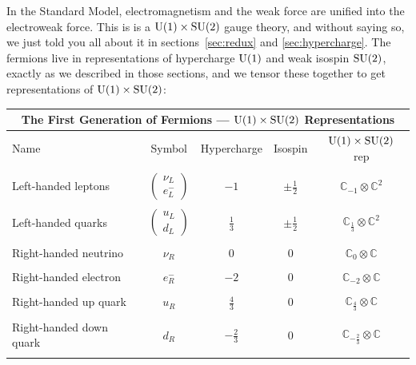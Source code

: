 \documentclass[12pt]{article}
\newcommand{\C}{{\mathbb C}}  %
\newcommand{\U}{{\rm U}}    %
\newcommand{\SU}{{\rm SU}}    %
\newcommand{\half}{\frac{1}{2}} %
\newcommand{\third}{\frac{1}{3}} %
\newcommand{\twothirds}{\frac{2}{3}} %
\newcommand{\fourthirds}{\frac{4}{3}} %
\newcommand{\lep}{\left( \! \begin{array}{c} \nu_L \\ e^-_L \end{array} \! \right)} %
\newcommand{\quark}{\left( \! \begin{array}{c} u_L \\ d_L \end{array} \! \right)} %
\begin{document}
In the Standard Model, electromagnetism and the weak force are unified into the
electroweak force. This is is a $\U(1) \times \SU(2)$ gauge theory, and without
saying so, we just told you all about it in sections~\ref{sec:redux} and
\ref{sec:hypercharge}. The fermions live in representations of hypercharge
$\U(1)$ and weak isospin $\SU(2)$, exactly as we described in those sections,
and we tensor these together to get representations of $\U(1) \times \SU(2)$:
\begin{center}
	\begin{tabular}{lcccc}
         \hline
         \multicolumn{5}{|c|}{\textbf{The First Generation of Fermions ---
\boldmath $\U(1) \times \SU(2)$ Representations}} \\
         \hline
         Name                    & Symbol   & Hypercharge   & Isospin    & $\U(1) \times \SU(2)$ rep \\
         \hline                              
	 \\
         Left-handed leptons     & $\lep$   & $-1$          & $\pm\half$ & $\C_{-1} \otimes \C^2$ \\
         \\                                                                                  
         Left-handed quarks      & $\quark$ & $\third$      & $\pm\half$ & $\C_{\third} \otimes \C^2$ \\
         \\                                                                                  
         Right-handed neutrino   & $\nu_R$  & $0$           & $0$        & $\C_{0} \otimes \C$ \\
	 \\                                                                                  
         Right-handed electron   & $e^-_R$  & $-2$          & $0$        & $\C_{-2} \otimes \C$ \\
	 \\                                                                                  
         Right-handed up quark   & $u_R$    & $\fourthirds$ & $0$        & $\C_{\fourthirds} \otimes \C$ \\
	 \\                                                                                  
         Right-handed down quark & $d_R$    & $-\twothirds$ & $0$        & $\C_{-\twothirds} \otimes \C$ \\
	 \\
         \hline                              
\end{tabular}                                
\end{center}
\end{document}

